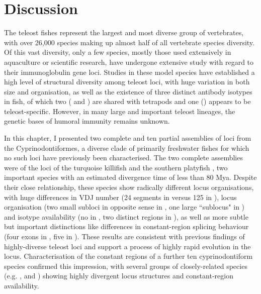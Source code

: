 

\newpage
\section{Discussion} %

The teleost fishes represent the largest and most diverse group of vertebrates, with over 26,000 species making up almost half of all vertebrate species diversity. Of this vast diversity, only a few species, mostly those used extensively in aquaculture or scientific research, have undergone extensive study with regard to their immunoglobulin gene loci. Studies in these model species have established a high level of structural diversity among teleost \igh{} loci, with huge variation in both size and organisation, as well as the existence of three distinct antibody isotypes in fish, of which two ( and ) are shared with tetrapods and one () appears to be teleost-specific. However, in many large and important teleost lineages, the genetic bases of humoral immunity remains unknown.

In this chapter, I presented two complete and ten partial assemblies of \igh{} loci from the Cyprinodontiformes, a diverse clade of primarily freshwater fishes for which no such loci have previously been characterised. The two complete assemblies were of the \igh{} loci of the turquoise killifish \nfu and the southern platyfish \xma, two important species with an estimated divergence time of less than 80 Mya. Despite their close relationship, these species show radically different locus organisations, with huge differences in VDJ number (24 \vh segments in \Nfu versus 125 in \Xma), locus organisation (two small subloci in opposite sense in \Nfu, one large ``sublocus" in \Xma) and isotype availability (no  in \Nfu, two distinct  regions in \Xma), as well as more subtle but important distinctions like differences in constant-region splicing behaviour (four exons in \Nfu {}, five in \Xma). These results are consistent with previous findings of highly-diverse teleost loci and support a process of highly rapid evolution in the \igh{} locus. Characterisation of the constant regions of a further ten cyprinodontiform species confirmed this impression, with several groups of closely-related species (e.g. \nfu,  and ) showing highly divergent locus structures and constant-region availability.

